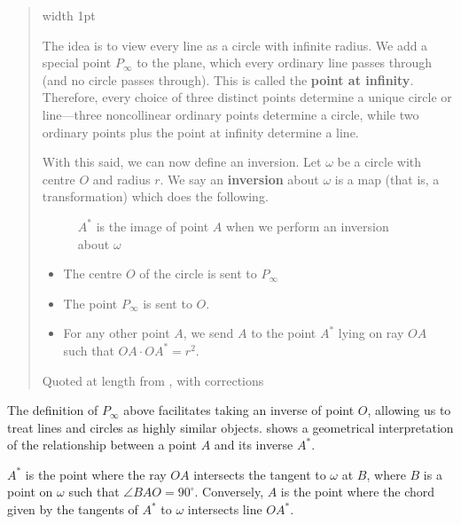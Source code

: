 \documentclass[a4paper, 12pt]{article}
\theoremstyle{definition}
\begin{document}
\begin{quote}
  \hspace{-1em}\vrule width 1pt\hspace{1em}%
  \begin{minipage}[t]{0.95\linewidth}
    \small
    \setlength{\parindent}{1em}
    \setlength{\baselineskip}{0.7\baselineskip}
    \noindent The idea is to view every line as a circle with infinite radius.
    We add a special point $P_\infty$ to the plane, which every ordinary line passes through (and no circle passes through).
    This is called the \textbf{point at infinity}.
    Therefore, every choice of three distinct points determine a unique circle or line---three noncollinear ordinary points determine a circle, while two ordinary points plus the point at infinity determine a line.
  

    With this said, we can now define an inversion. Let $\omega$ be a circle with centre $O$ and radius $r$.
    We say an \textbf{inversion} about $\omega$ is a map (that is, a transformation) which does the following.
    \begin{figure}[H]
      \begin{center}
        
      \end{center}
      \caption{\small $A^*$ is the image of point $A$ when we perform an inversion about $\omega$}
      \label{fig:4}
    \end{figure}

    \begin{itemize}
      \item The centre $O$ of the circle is sent to $P_\infty$
      \item The point $P_\infty$ is sent to $O$.
      \item For any other point $A$, we send $A$ to the point $A^*$ lying on ray $OA$ such that $OA\cdot OA^* = r^2$.
    \end{itemize}
    \hfill {\color{gray} \footnotesize Quoted at length from \cite{Chen2016}, with corrections}
  \end{minipage}
\end{quote}

The definition of $P_\infty$ above facilitates taking an inverse of point $O$, allowing us to treat lines and circles as highly similar objects.
 shows a geometrical interpretation of the relationship between a point $A$ and its inverse $A^*$.

$A^*$ is the point where the ray $OA$ intersects the tangent to $\omega$ at $B$, where $B$ is a point on $\omega$ such that $\angle BAO=90^\circ$.
Conversely, $A$ is the point where the chord given by the tangents of $A^*$ to $\omega$ intersects line $OA^*$.
\end{document}
